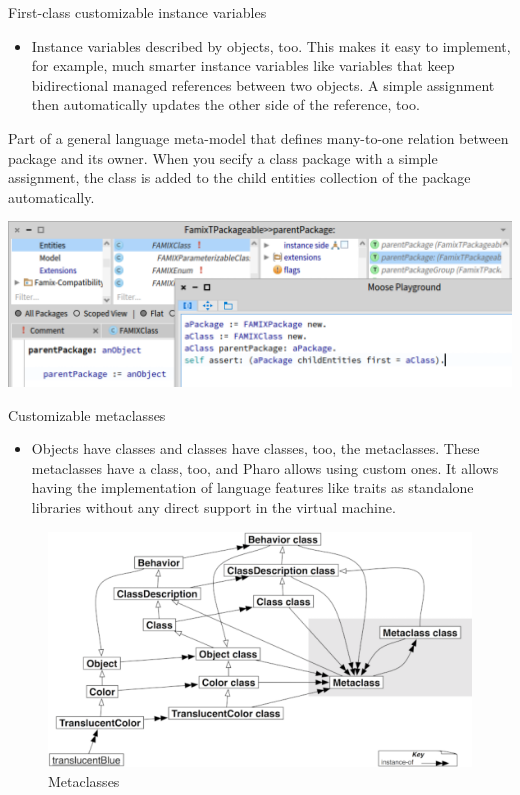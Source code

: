 \documentclass{beamer}
\begin{document}
\begin{frame}{First-class customizable instance variables}
\begin{itemize}
    \item Instance variables described by objects, too. This makes it easy to implement, for example, much smarter instance variables like variables that keep bidirectional managed references between two objects. A simple assignment then automatically updates the other side of the reference, too.
\end{itemize}
\begin{block}{}
Part of a general language meta-model that defines many-to-one relation between package and its owner. When you secify a class package with a simple assignment, the class is added to the child entities collection of the package automatically.
\end{block}
\includegraphics[width=0.5\linewidth]{slots2.png}
\end{frame}

\begin{frame}{Customizable metaclasses}
\begin{itemize}
    \item Objects have classes and classes have classes, too, the metaclasses. These metaclasses have a class, too, and Pharo allows using custom ones. It allows having the implementation of language features like traits as standalone libraries without any direct support in the virtual machine.
\end{itemize}
\begin{figure}
    \centering
    \includegraphics[width=0.5\linewidth]{metaclass.png}
    \caption{Metaclasses}
    \label{fig:metaclass}
\end{figure}

\end{frame}
\end{document}
